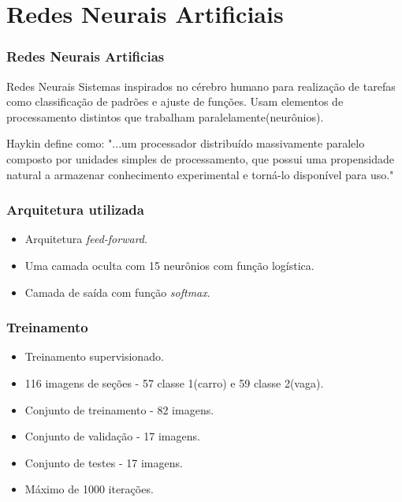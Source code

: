 \documentclass{beamer}
\begin{document}
\section{Redes Neurais Artificiais}

\begin{frame}
\frametitle{Redes Neurais Artificias}
\begin{block}{Redes Neurais}
Sistemas inspirados no cérebro humano para realização de tarefas como classificação de padrões e ajuste de funções. Usam elementos de processamento distintos que trabalham paralelamente(neurônios).
\end{block}

\begin{block}{Haykin define como:}
 "...um processador distribuído massivamente paralelo composto por unidades simples de processamento, que possui uma propensidade natural a armazenar conhecimento experimental e torná-lo disponível para uso."
\end{block}
\end{frame}

%

\begin{frame}
\frametitle{Arquitetura utilizada}
\begin{itemize}
	\item Arquitetura \textit{feed-forward}.
	\item Uma camada oculta com 15 neurônios com função logística.
	\item Camada de saída com função  \textit{softmax}.
\end{itemize}
\end{frame}

\begin{frame}
\frametitle{Treinamento}
\begin{itemize}
	\item Treinamento supervisionado.
	\item 116 imagens de seções - 57 classe 1(carro) e 59 classe 2(vaga).
	\item Conjunto de treinamento - 82 imagens.
	\item Conjunto de validação - 17 imagens.
	\item Conjunto de testes - 17 imagens.
	\item Máximo de 1000 iterações.
\end{itemize}
\end{frame}
\end{document}

